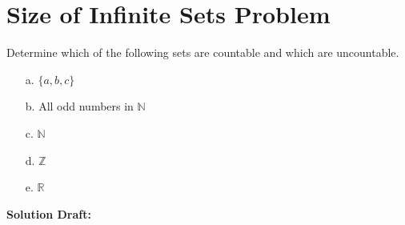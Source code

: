 \documentclass{article}
\begin{document}
\section*{Size of Infinite Sets Problem}  

Determine which of the following sets are countable and which are uncountable.
\begin{enumerate}
    \item[a.] $\{a, b, c\}$
    \item[b.] All odd numbers in $\mathbb{N}$
    \item[c.] $\mathbb{N}$
    \item[d.] $\mathbb{Z}$
    \item[e.] $\mathbb{R}$
\end{enumerate}

\vspace{0.5cm}
\noindent\textbf{Solution Draft:} 
\vspace{0.2cm}
\end{document}
